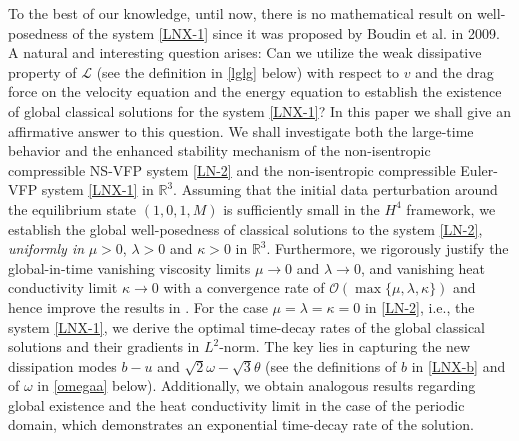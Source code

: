 \documentclass[reqno,11pt]{amsart}
\theoremstyle{plain}
\numberwithin{equation}{section}
\begin{document}
To the best of our knowledge, until now, there is no mathematical result on well-posedness of the 
 system \eqref{LNX-1} since it was proposed by Boudin et al. in 2009. A natural and interesting 
 question arises: Can we utilize the weak dissipative property of $\mathcal{L}$
  (see the definition in \eqref{lglg} below) with respect to $v$ and the drag force
   on the velocity equation and the energy equation to establish the existence of 
   global classical solutions for the system \eqref{LNX-1}?
In this paper we shall give an affirmative answer to this question. 
We shall  investigate both the large-time behavior and the enhanced stability mechanism
 of the non-isentropic compressible NS-VFP  system \eqref{LN-2} and the
 non-isentropic compressible  Euler-VFP system \eqref{LNX-1} in   $\mathbb{R}^3$.
Assuming that the initial data perturbation around the equilibrium state
  $(1, 0, 1, M)$    is sufficiently small in the   $H^4$ framework, we establish the global well-posedness 
 of classical solutions to the system \eqref{LN-2}, \emph{uniformly in}  $\mu>0$, $\lambda>0$ and 
  $\kappa>0$  in $\mathbb{R}^3$.   Furthermore, we rigorously justify the global-in-time 
  vanishing viscosity limits $\mu\rightarrow0$ and $\lambda\rightarrow 0$, and
vanishing heat conductivity limit $\kappa \rightarrow 0$ with a convergence rate of 
$\mathcal{O}(\max\{\mu,\lambda,\kappa\})$ and hence improve the results in \cite{Mu-Wang-20}. 
 For the case $\mu=\lambda=\kappa=0$ in  \eqref{LN-2}, i.e., the  
 system \eqref{LNX-1}, we derive the optimal time-decay rates of 
 the global classical solutions and their gradients in   $L^2$-norm. 
 The key lies in capturing the new dissipation modes $b-u$ and $\sqrt{2}\omega-\sqrt{3}\theta$ 
 (see the definitions of $b$ in \eqref{LNX-b} and of $\omega$ in \eqref{omegaa} below). 
 Additionally, we obtain analogous results regarding global existence and the heat
  conductivity limit in the case of the periodic domain, which demonstrates an exponential
   time-decay rate of the solution. 
   
\end{document}
